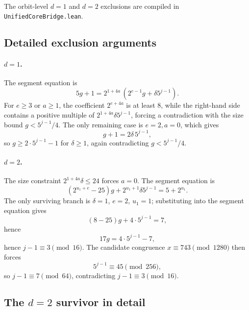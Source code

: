 The orbit-level $d=1$ and $d=2$ exclusions are compiled in
\texttt{UnifiedCoreBridge.lean}.

\subsection{Detailed exclusion arguments}

\paragraph{$d=1$.}
The segment equation is
\begin{equation*}
  5g+1=2^{1+4a}\,(2^{e-1}g+\delta5^{j-1}).
\end{equation*}
For $e\ge3$ or $a\ge1$, the coefficient $2^{e+4a}$ is at least $8$,
while the right-hand side contains a positive multiple of
$2^{1+4a}\delta5^{j-1}$, forcing a contradiction with the size bound
$g<5^{j-1}/4$.  The only remaining case is $e=2,a=0$, which gives
\begin{equation*}
  g+1=2\delta\,5^{j-1},
\end{equation*}
so $g\ge2\cdot5^{j-1}-1$ for $\delta\ge1$, again contradicting
$g<5^{j-1}/4$.

\paragraph{$d=2$.}
The size constraint $2^{1+4a}\delta\le24$ forces $a=0$.  The segment
equation is
\begin{equation*}
  (2^{u_1+e}-25)g+2^{u_1+1}\delta5^{j-1}=5+2^{u_1}.
\end{equation*}
The only surviving branch is $\delta=1$, $e=2$, $u_1=1$; substituting
into the segment equation gives
\begin{equation*}
  (8-25)g+4\cdot5^{j-1}=7,
\end{equation*}
hence
\begin{equation*}
  17g=4\cdot5^{j-1}-7,
\end{equation*}
hence $j-1\equiv3\pmod{16}$.  The candidate congruence
$x\equiv743\pmod{1280}$ then forces
\begin{equation*}
  5^{j-1}\equiv45\pmod{256},
\end{equation*}
so $j-1\equiv7\pmod{64}$, contradicting $j-1\equiv3\pmod{16}$.

\subsection{The $d=2$ survivor in detail}

